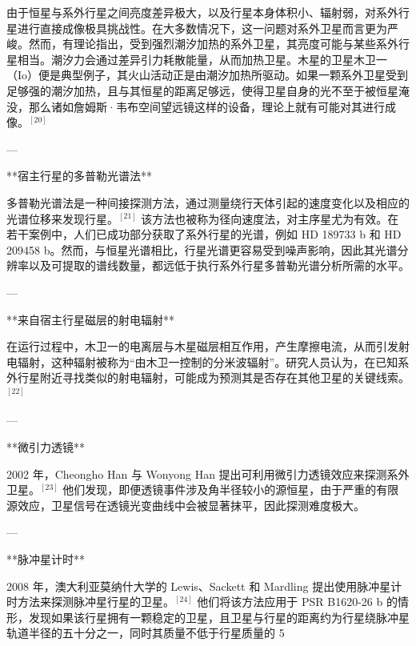 由于恒星与系外行星之间亮度差异极大，以及行星本身体积小、辐射弱，对系外行星进行直接成像极具挑战性。在大多数情况下，这一问题对系外卫星而言更为严峻。然而，有理论指出，受到强烈潮汐加热的系外卫星，其亮度可能与某些系外行星相当。潮汐力会通过差异引力耗散能量，从而加热卫星。木星的卫星木卫一（Io）便是典型例子，其火山活动正是由潮汐加热所驱动。如果一颗系外卫星受到足够强的潮汐加热，且与其恒星的距离足够远，使得卫星自身的光不至于被恒星淹没，那么诸如詹姆斯·韦布空间望远镜这样的设备，理论上就有可能对其进行成像。$^{[20]}$

---

**宿主行星的多普勒光谱法**

多普勒光谱法是一种间接探测方法，通过测量绕行天体引起的速度变化以及相应的光谱位移来发现行星。$^{[21]}$ 该方法也被称为径向速度法，对主序星尤为有效。在若干案例中，人们已成功部分获取了系外行星的光谱，例如 HD 189733 b 和 HD 209458 b。然而，与恒星光谱相比，行星光谱更容易受到噪声影响，因此其光谱分辨率以及可提取的谱线数量，都远低于执行系外行星多普勒光谱分析所需的水平。

---

**来自宿主行星磁层的射电辐射**

在运行过程中，木卫一的电离层与木星磁层相互作用，产生摩擦电流，从而引发射电辐射，这种辐射被称为“由木卫一控制的分米波辐射”。研究人员认为，在已知系外行星附近寻找类似的射电辐射，可能成为预测其是否存在其他卫星的关键线索。$^{[22]}$

---

**微引力透镜**

2002 年，Cheongho Han 与 Wonyong Han 提出可利用微引力透镜效应来探测系外卫星。$^{[23]}$ 他们发现，即便透镜事件涉及角半径较小的源恒星，由于严重的有限源效应，卫星信号在透镜光变曲线中会被显著抹平，因此探测难度极大。

---

**脉冲星计时**

2008 年，澳大利亚莫纳什大学的 Lewis、Sackett 和 Mardling 提出使用脉冲星计时方法来探测脉冲星行星的卫星。$^{[24]}$ 他们将该方法应用于 PSR B1620-26 b 的情形，发现如果该行星拥有一颗稳定的卫星，且卫星与行星的距离约为行星绕脉冲星轨道半径的五十分之一，同时其质量不低于行星质量的 5%
